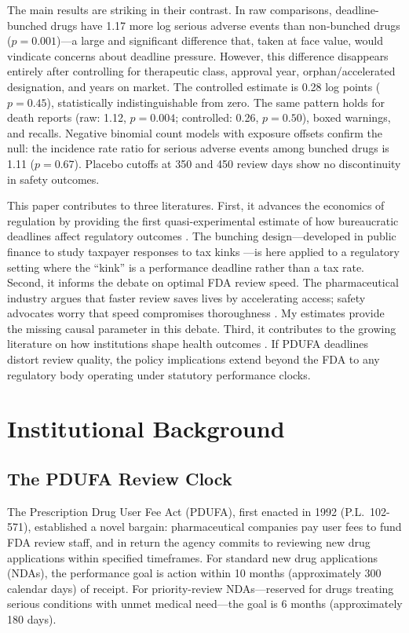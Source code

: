 \documentclass[12pt]{article}
\begin{document}
The main results are striking in their contrast. In raw comparisons, deadline-bunched drugs have 1.17 more log serious adverse events than non-bunched drugs ($p = 0.001$)---a large and significant difference that, taken at face value, would vindicate concerns about deadline pressure. However, this difference disappears entirely after controlling for therapeutic class, approval year, orphan/accelerated designation, and years on market. The controlled estimate is 0.28 log points ($p = 0.45$), statistically indistinguishable from zero. The same pattern holds for death reports (raw: 1.12, $p = 0.004$; controlled: 0.26, $p = 0.50$), boxed warnings, and recalls. Negative binomial count models with exposure offsets confirm the null: the incidence rate ratio for serious adverse events among bunched drugs is 1.11 ($p = 0.67$). Placebo cutoffs at 350 and 450 review days show no discontinuity in safety outcomes.

This paper contributes to three literatures. First, it advances the economics of regulation by providing the first quasi-experimental estimate of how bureaucratic deadlines affect regulatory outcomes \citep{carpenter2004political, philipson2008regulation}. The bunching design---developed in public finance to study taxpayer responses to tax kinks \citep{saez2010taxpayers, kleven2016bunching}---is here applied to a regulatory setting where the ``kink'' is a performance deadline rather than a tax rate. Second, it informs the debate on optimal FDA review speed. The pharmaceutical industry argues that faster review saves lives by accelerating access; safety advocates worry that speed compromises thoroughness \citep{frank2014impact, dimasi2016innovation}. My estimates provide the missing causal parameter in this debate. Third, it contributes to the growing literature on how institutions shape health outcomes \citep{budish2015cancer, stern2017innovation}. If PDUFA deadlines distort review quality, the policy implications extend beyond the FDA to any regulatory body operating under statutory performance clocks.

\section{Institutional Background}

\subsection{The PDUFA Review Clock}

The Prescription Drug User Fee Act (PDUFA), first enacted in 1992 (P.L.\ 102-571), established a novel bargain: pharmaceutical companies pay user fees to fund FDA review staff, and in return the agency commits to reviewing new drug applications within specified timeframes. For standard new drug applications (NDAs), the performance goal is action within 10 months (approximately 300 calendar days) of receipt. For priority-review NDAs---reserved for drugs treating serious conditions with unmet medical need---the goal is 6 months (approximately 180 days).
\end{document}
